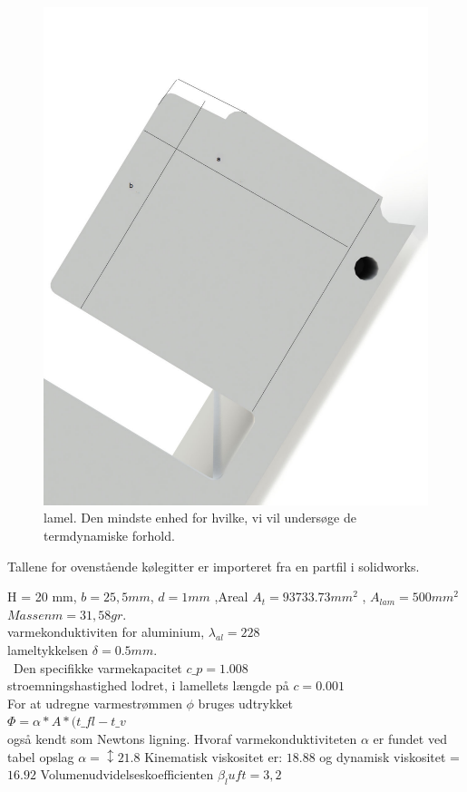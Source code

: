 \begin{figure}
	\centering
	\includegraphics[width=0.7\linewidth]{billeder/lamel}
	\caption{lamel. Den mindste enhed for hvilke, vi vil undersøge de termdynamiske forhold.}
	\label{fig:lamel}
\end{figure}



Tallene for ovenstående kølegitter er importeret fra en partfil i solidworks. %

H = 20 mm, $b = 25,5 mm$, $d  =1 mm$ ,Areal $A_t = 93733.73 mm^2$ , $A_{lam}= 500 mm^2$  \\ $Massen m = 31,58 gr.$ \\
varmekonduktiviten for aluminium, $\lambda_{al} = 228$ \\  
lameltykkelsen $\delta = 0.5 mm.$  \\\
Den specifikke varmekapacitet $c\_p = 1.008$ \\
stroemningshastighed lodret, i lamellets længde på $c = 0.001$ \\



For at udregne varmestrømmen $\phi$  bruges udtrykket \\ $\Phi = \alpha * A* (t\_{fl}-t\_v$ \\  også kendt som Newtons ligning. 
Hvoraf varmekonduktiviteten $\alpha$ er fundet ved tabel opslag $\alpha = ↕21.8$
Kinematisk viskositet er: $18.88$ og dynamisk viskositet = $16.92$ 
Volumenudvidelseskoefficienten $\beta_luft = 3,2$
 


